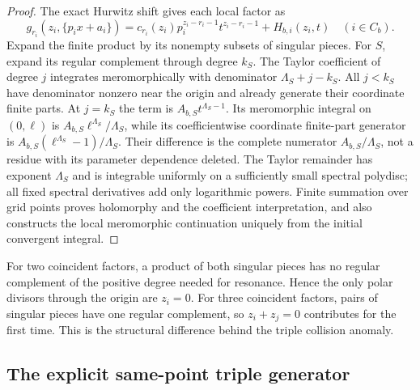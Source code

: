 \begin{proof}
The exact Hurwitz shift gives each local factor as
\[
 g_{r_i}(z_i,\{p_ix+a_i\})
 =c_{r_i}(z_i)p_i^{z_i-r_i-1}t^{z_i-r_i-1}
       +H_{b,i}(z_i,t)\quad(i\in C_b).
\]
Expand the finite product by its nonempty subsets of singular pieces.
For $S$, expand its regular complement through degree $k_S$. The
Taylor coefficient of degree $j$ integrates meromorphically with
denominator $\Lambda_S+j-k_S$. All $j<k_S$ have denominator nonzero
near the origin and already generate their coordinate finite parts.
At $j=k_S$ the term is $A_{b,S}t^{\Lambda_S-1}$.
Its meromorphic integral on $(0,\ell)$ is
$A_{b,S}\ell^{\Lambda_S}/\Lambda_S$, while its coefficientwise
coordinate finite-part generator is
$A_{b,S}(\ell^{\Lambda_S}-1)/\Lambda_S$. Their difference is the
complete numerator $A_{b,S}/\Lambda_S$, not a residue with its
parameter dependence deleted. The Taylor remainder has exponent
$\Lambda_S$ and is integrable uniformly on a sufficiently small
spectral polydisc; all fixed spectral derivatives add only logarithmic
powers. Finite summation over grid points proves holomorphy and the
coefficient interpretation, and also constructs the local meromorphic
continuation uniquely from the initial convergent integral.
\end{proof}

For two coincident factors, a product of both singular pieces has no
regular complement of the positive degree needed for resonance. Hence
the only polar divisors through the origin are $z_i=0$. For three
coincident factors, pairs of singular pieces have one regular
complement, so $z_i+z_j=0$ contributes for the first time. This is the
structural difference behind the triple collision anomaly.

\subsection{The explicit same-point triple generator}
\label{cl:triple}

